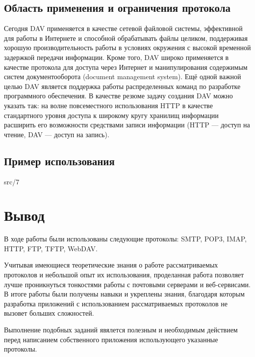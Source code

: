 \subsection{Область применения и ограничения протокола}
Сегодня DAV применяется в качестве сетевой файловой системы, эффективной для работы в Интернете и способной обрабатывать файлы целиком, поддерживая хорошую производительность работы в условиях окружения с высокой временной задержкой передачи информации. Кроме того, DAV широко применяется в качестве протокола для доступа через Интернет и манипулирования содержимым систем документооборота (document management system). Ещё одной важной целью DAV является поддержка работы распределенных команд по разработке программного обеспечения. В качестве резюме задачу создания DAV можно указать так: на волне повсеместного использования HTTP в качестве стандартного уровня доступа к широкому кругу хранилищ информации расширить его возможности средствами записи информации (HTTP — доступ на чтение, DAV — доступ на запись). 

\subsection{Пример использования}
 {src/7}

\section{Вывод}
В ходе работы были использованы следующие протоколы: SMTP, POP3, IMAP, HTTP, FTP, TFTP, WebDAV.

Учитывая имеющиеся теоретические знания о работе рассматриваемых протоколов и небольшой опыт их использования, проделанная работа позволяет лучше проникнуться тонкостями работы с почтовыми серверами и веб-сервисами. В итоге работы были получены навыки и укреплены знания, благодаря которым разработка приложений с использованием рассматриваемых протоколов не вызовет больших сложностей. 

Выполнение подобных заданий явялется полезным и необходимым действием перед написанием собственного приложения использующего указанные протоколы.



